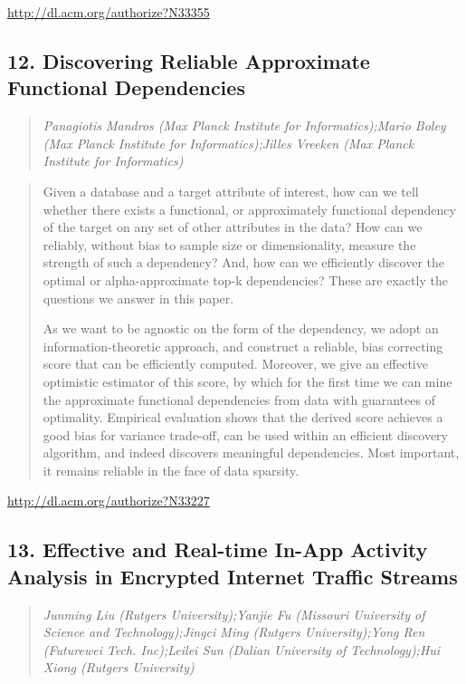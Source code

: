 \documentclass{article}
\begin{document}
\href{http://dl.acm.org/authorize?N33355}{http://dl.acm.org/authorize?N33355}

\subsection{12. Discovering Reliable Approximate Functional Dependencies}

\begin{quote}
\footnotesize{\textit{Panagiotis Mandros (Max Planck Institute for Informatics);Mario Boley (Max Planck Institute for Informatics);Jilles Vreeken (Max Planck Institute for Informatics)}}

\end{quote}

\begin{quote}
Given a database and a target attribute of interest, how can we tell whether there exists a functional, or approximately functional dependency of the target on any set of other attributes in the data? How can we reliably, without bias to sample size or dimensionality, measure the strength of such a dependency? And, how can we efficiently discover the optimal or alpha-approximate top-k dependencies? These are exactly the questions we answer in this paper.







  As we want to be agnostic on the form of the dependency, we adopt an information-theoretic approach, and construct a reliable, bias correcting score that can be efficiently computed. Moreover, we give an effective optimistic estimator of this score, by which for the first time we can mine the approximate functional dependencies from data with guarantees of optimality. Empirical evaluation shows that the derived score achieves a good bias for variance trade-off, can be used within an efficient discovery algorithm, and indeed discovers meaningful dependencies. Most important, it remains reliable in the face of data sparsity.
\end{quote}

\href{http://dl.acm.org/authorize?N33227}{http://dl.acm.org/authorize?N33227}

\subsection{13. Effective and Real-time In-App Activity Analysis in Encrypted Internet Traffic Streams}

\begin{quote}
\footnotesize{\textit{Junming Liu (Rutgers University);Yanjie Fu (Missouri University of Science and Technology);Jingci Ming (Rutgers University);Yong Ren (Futurewei Tech. Inc);Leilei Sun (Dalian University of Technology);Hui Xiong (Rutgers University)}}

\end{quote}
\end{document}
